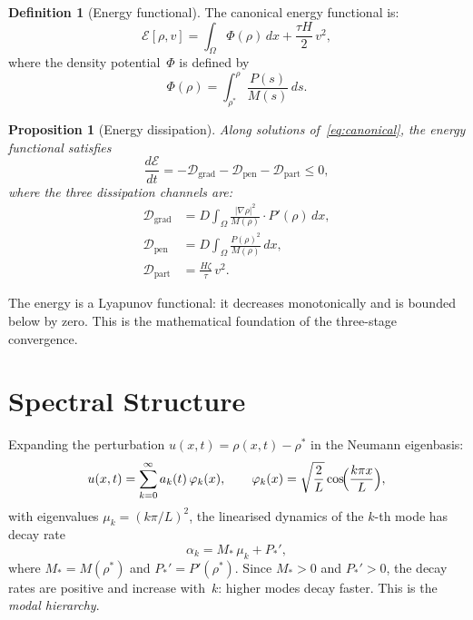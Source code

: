 \documentclass[11pt,twoside,openright]{book}
\theoremstyle{definition}
\newtheorem{definition}{Definition}[chapter]
\theoremstyle{plain}
\newtheorem{proposition}{Proposition}[chapter]
\theoremstyle{definition}
\theoremstyle{remark}
\newcommand{\rhostar}{\rho^{*}}
\newcommand{\Dgrad}{\mathcal{D}_{\mathrm{grad}}}
\newcommand{\Dpen}{\mathcal{D}_{\mathrm{pen}}}
\newcommand{\Dpart}{\mathcal{D}_{\mathrm{part}}}
\newcommand{\Energy}{\mathcal{E}}
\begin{document}
\begin{definition}[Energy functional]\label{def:energy}
The canonical energy functional is:
\begin{equation}\label{eq:energy}
\Energy[\rho, v] = \int_\Omega \Phi(\rho)\,dx + \frac{\tau H}{2}\,v^2,
\end{equation}
where the density potential~\(\Phi\) is defined by
\begin{equation}\label{eq:potential}
\Phi(\rho) = \int_{\rhostar}^{\rho} \frac{P(s)}{M(s)}\,ds.
\end{equation}
\end{definition}

\begin{proposition}[Energy dissipation]\label{prop:dissipation}
Along solutions of~\eqref{eq:canonical}, the energy functional satisfies
\begin{equation}\label{eq:dissipation}
\frac{d\Energy}{dt} = -\Dgrad - \Dpen - \Dpart \leq 0,
\end{equation}
where the three dissipation channels are:
\begin{align*}
\Dgrad &= D\int_\Omega \frac{|\nabla\rho|^2}{M(\rho)}\cdot P'(\rho)\,dx, \\
\Dpen &= D\int_\Omega \frac{P(\rho)^2}{M(\rho)}\,dx, \\
\Dpart &= \frac{H\zeta}{\tau}\,v^2.
\end{align*}
\end{proposition}

The energy is a Lyapunov functional: it decreases monotonically and is bounded below by zero. This is the mathematical foundation of the three-stage convergence.

\section{Spectral Structure}\label{sec:spectral}

Expanding the perturbation \(u(x,t) = \rho(x,t) - \rhostar\) in the Neumann eigenbasis:
\begin{equation}\label{eq:eigenbasis}
u(x,t) = \sum_{k=0}^{\infty} a_k(t)\,\varphi_k(x), \qquad \varphi_k(x) = \sqrt{\frac{2}{L}}\cos\!\Bigl(\frac{k\pi x}{L}\Bigr),
\end{equation}
with eigenvalues \(\mu_k = (k\pi/L)^2\), the linearised dynamics of the \(k\)-th mode has decay rate
\begin{equation}\label{eq:decay-rate}
\alpha_k = M_*\,\mu_k + P_*',
\end{equation}
where \(M_* = M(\rhostar)\) and \(P_*' = P'(\rhostar)\). Since \(M_* > 0\) and \(P_*' > 0\), the decay rates are positive and increase with~\(k\): higher modes decay faster. This is the \emph{modal hierarchy}.
\end{document}
